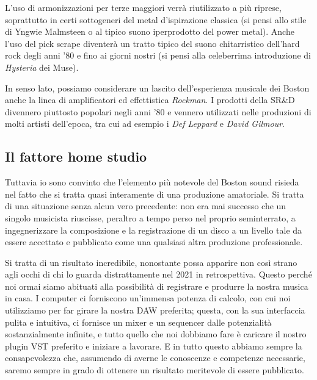 \documentclass[class=book, crop=false, oneside, 12pt]{standalone}
\begin{document}
L'uso di armonizzazioni per terze maggiori verrà riutilizzato a più riprese, soprattutto in certi sottogeneri del metal d'ispirazione classica (si pensi allo stile di Yngwie Malmsteen o al tipico suono iperprodotto del power metal). Anche l'uso del pick scrape diventerà un tratto tipico del suono chitarristico dell'hard rock degli anni '80 e fino ai giorni nostri (si pensi alla celeberrima introduzione di \emph{Hysteria} dei Muse).

In senso lato, possiamo considerare un lascito dell'esperienza musicale dei Boston anche la linea di amplificatori ed effettistica \emph{Rockman}. I prodotti della SR\&D divennero piuttosto popolari negli anni '80 e vennero utilizzati nelle produzioni di molti artisti dell'epoca, tra cui ad esempio i \emph{Def Leppard} e \emph{David Gilmour}.

\subsection{Il fattore home studio}
Tuttavia io sono convinto che l'elemento più notevole del Boston sound risieda nel fatto che si tratta quasi interamente di una produzione amatoriale. Si tratta di una situazione senza alcun vero precedente: non era mai successo che un singolo musicista riuscisse, peraltro a tempo perso nel proprio seminterrato, a ingegnerizzare la composizione e la registrazione di un disco a un livello tale da essere accettato e pubblicato come una qualsiasi altra produzione professionale. 

Si tratta di un risultato incredibile, nonostante possa apparire non così strano agli occhi di chi lo guarda distrattamente nel 2021 in retrospettiva. Questo perché noi ormai siamo abituati alla possibilità di registrare e produrre la nostra musica in casa. I computer ci forniscono un'immensa potenza di calcolo, con cui noi utilizziamo per far girare la nostra DAW preferita; questa, con la sua interfaccia pulita e intuitiva, ci fornisce un mixer e un sequencer dalle potenzialità sostanzialmente infinite, e tutto quello che noi dobbiamo fare è caricare il nostro plugin VST preferito e iniziare a lavorare. E in tutto questo abbiamo sempre la consapevolezza che, assumendo di averne le conoscenze e competenze necessarie, saremo sempre in grado di ottenere un risultato meritevole di essere pubblicato. 
\end{document}
